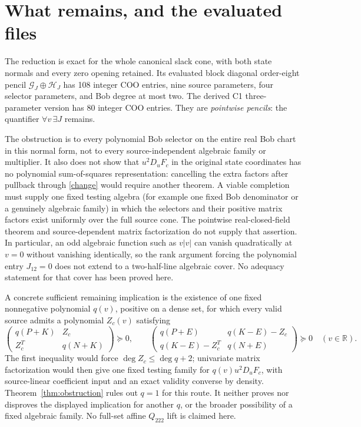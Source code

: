 \documentclass[11pt]{article}
\newcommand{\PSD}{\succeq0}
\newcommand{\R}{\mathbb R}
\begin{document}
\section{What remains, and the evaluated files}
The reduction is exact for the whole canonical slack cone, with both state
normals and every zero opening retained.  Its evaluated block diagonal
order-eight pencil $\mathcal G_J\oplus\mathcal H_J$ has 108 integer COO entries,
nine source parameters, four selector parameters, and Bob degree at most two.
The derived C1 three-parameter version has 80 integer COO entries.  They are
\emph{pointwise pencils}: the quantifier $\forall v\,\exists J$ remains.

The obstruction is to every polynomial Bob selector on the entire real Bob
chart in this normal form,
not to every source-independent algebraic family or multiplier.  It also
does not show that $u^2D_uF_c$ in the original state coordinates has no
polynomial sum-of-squares representation: cancelling the extra factors after
pullback through \eqref{change} would require another theorem.  A viable
completion must supply one fixed testing algebra (for example one fixed
Bob denominator or a genuinely algebraic family) in which the selectors and
their positive matrix factors exist uniformly over the full source cone.
The pointwise real-closed-field theorem and source-dependent matrix
factorization do not supply that assertion.  In particular, an odd algebraic
function such as $v|v|$ can vanish quadratically at $v=0$ without vanishing
identically, so the rank argument forcing the polynomial entry $J_{12}=0$
does not extend to a two-half-line algebraic cover.  No adequacy statement
for that cover has been proved here.

A concrete sufficient remaining implication is the existence of one fixed
nonnegative polynomial $q(v)$, positive on a dense set, for which every valid
source admits a polynomial $Z_c(v)$ satisfying
\[
\begin{pmatrix}q(P+K)&Z_c\\Z_c^T&q(N+K)\end{pmatrix}\PSD,\qquad
\begin{pmatrix}q(P+E)&q(K-E)-Z_c\\q(K-E)-Z_c^T&q(N+E)\end{pmatrix}\PSD
\quad(v\in\R).
\]
The first inequality would force $\deg Z_c\leq\deg q+2$; univariate
matrix factorization would then give one fixed testing family for
$q(v)u^2D_uF_c$, with source-linear coefficient input and an exact
validity converse by density. Theorem~\ref{thm:obstruction} rules out $q=1$
for this route. It neither proves nor disproves the displayed implication
for another $q$, or the broader possibility of a fixed algebraic family.
No full-set affine $Q_{222}$ lift is claimed here.
\end{document}
